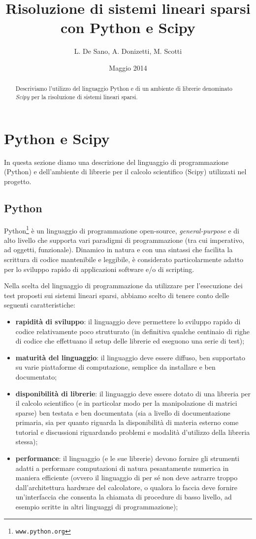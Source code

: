 \documentclass[11pt,a4paper]{scrartcl}
\author{L. De Sano, A. Donizetti, M. Scotti}
\title{Risoluzione di sistemi lineari sparsi \\con Python e Scipy}
\date{Maggio 2014}
\begin{document}
\maketitle
\begin{abstract}
Descriviamo l'utilizzo del linguaggio Python e di un ambiente di librerie denominato \emph{Scipy} per la risoluzione di sistemi lineari sparsi.
\end{abstract}

\section*{Python e Scipy}

In questa sezione diamo una descrizione del linguaggio di programmazione (Python) e dell'ambiente di librerie per il calcolo scientifico (Scipy) utilizzati nel progetto.

\subsection*{Python}

Python\footnote{\texttt{www.python.org}} è un linguaggio di programmazione open-source, \emph{general-purpose} e di alto livello che supporta vari paradigmi di programmazione (tra cui imperativo, ad oggetti, funzionale). Dinamico in natura e con una sintassi che facilita la scrittura di codice mantenibile e leggibile, è considerato particolarmente adatto per lo sviluppo rapido di applicazioni software e/o di scripting.

Nella scelta del linguaggio di programmazione da utilizzare per l'esecuzione dei test proposti sui sistemi lineari sparsi, abbiamo scelto di tenere conto delle seguenti caratteristiche:
\begin{itemize}
	\item \textbf{rapidità di sviluppo}: il linguaggio deve permettere lo sviluppo rapido di codice relativamente poco strutturato 		(in definitiva qualche centinaio di righe di codice che effettuano il setup delle librerie ed eseguono una serie di test);
	\item \textbf{maturità del linguaggio}: il linguaggio deve essere diffuso, ben supportato su varie piattaforme di computazione, 	semplice da installare e ben documentato;
	\item \textbf{disponibilità di librerie}: il linguaggio deve essere dotato di una libreria per il calcolo scientifico (e in particolar modo per la manipolazione di matrici sparse) ben testata e ben documentata (sia a livello di documentazione primaria, sia per quanto riguarda la disponibilità di materia esterno come tutorial e discussioni riguardando problemi e modalità d'utilizzo della libreria stessa);
	\item \textbf{performance}: il linguaggio (e le sue librerie) devono fornire gli strumenti adatti a performare computazioni di 		natura pesantamente numerica in maniera efficiente (ovvero il linguaggio di per sé non deve astrarre troppo dall'architettura    	hardware del calcolatore, o qualora lo faccia deve fornire un'interfaccia che consenta la chiamata di procedure di basso 				livello, ad esempio scritte in altri linguaggi di programmazione);
\end{itemize}
\end{document}
